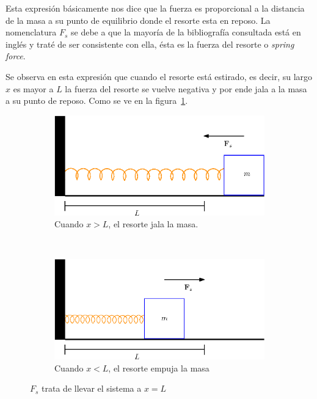 Esta expresión básicamente nos dice que la fuerza es proporcional a la distancia de la masa a su punto de equilibrio donde el resorte esta en reposo.
La nomenclatura $F_s$ se debe a que la mayoría de la bibliografía consultada está en inglés y traté de ser consistente con ella, ésta es la fuerza del resorte o \emph{\foreignlanguage{english}{spring force}}.

Se observa en esta expresión que cuando el resorte está estirado, es decir, su largo $x$ es mayor a $L$ la fuerza del resorte se vuelve negativa y por ende jala a la masa a su punto de reposo.
Como se ve en la figura~\ref{fig:estirada}.

\begin{figure}
 \centering
  \begin{subfigure}[b]{0.5\textwidth}
    \includegraphics[width=\textwidth]{Img/masaEstirada}
    \caption{Cuando $x>L$, el resorte jala la masa.}
  \label{fig:estirada}
  \end{subfigure}
\\
  \begin{subfigure}[b]{0.5\textwidth}
    \includegraphics[width=\textwidth]{Img/masaCompresa}
    \caption{Cuando $x<L$, el resorte empuja la masa}
    \label{fig:compresa}
  \end{subfigure}
 \caption[Ley de Hooke para resortes]{ 
 $F_s$ trata de llevar el sistema a $x = L$
 } \label{leyHokke:fig}
\end{figure}

